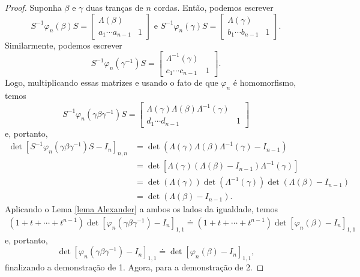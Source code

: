 \begin{proof}
		\par\vspace{0.3cm} Suponha $\beta$ e $\gamma$ duas tranças de $n$ cordas. Então, podemos escrever
		\begin{equation*}
    		S^{-1}\varphi_n(\beta)S = \left[ \begin{array}{c|c}
    		\Lambda(\beta) & \\
    		\hline
    		a_1\cdots a_{n-1} & 1
    		\end{array}\right] \text{ e } 
    		S^{-1}\varphi_n(\gamma)S = \left[  \begin{array}{c|c}
    		\Lambda(\gamma) & \\
    		\hline 
    		b_1 \cdots b_{n-1} & 1
    		\end{array}\right].
		\end{equation*}
		Similarmente, podemos escrever
		\begin{equation*}
    		S^{-1}\varphi_n(\gamma^{-1})S = \left[\begin{array}{c|c}
    		\Lambda^{-1}(\gamma) & \\
    		\hline 
    		c_1\cdots c_{n-1} & 1
    		\end{array}\right].
		\end{equation*}
		Logo, multiplicando essas matrizes e usando o fato de que $\varphi_n$ é homomorfismo, temos
		\begin{equation*}
    		S^{-1}\varphi_n(\gamma\beta\gamma^{-1})S = \left[\begin{array}{c|c}
    		\Lambda(\gamma)\Lambda(\beta)\Lambda^{-1}(\gamma) & \\
    		\hline 
    		d_1\cdots d_{n-1} & 1
    		\end{array}\right]
		\end{equation*}
		e, portanto,
		\begin{align*}
    		\det[S^{-1}\varphi_n(\gamma\beta\gamma^{-1})S - I_n]_{n,n} &= \det(\Lambda(\gamma)\Lambda(\beta)\Lambda^{-1}(\gamma) - I_{n-1}) \\ 
    		&= \det[\Lambda(\gamma)(\Lambda(\beta) - I_{n-1})\Lambda^{-1}(\gamma)] \\
    		&= \det(\Lambda(\gamma))\det(\Lambda^{-1}(\gamma))\det(\Lambda(\beta) - I_{n-1}) \\
    		&= \det(\Lambda(\beta) - I_{n-1}).
		\end{align*}
		Aplicando o Lema \ref{lema Alexander} a ambos os lados da igualdade, temos
		\begin{align*}
    		(1 + t + \cdots + t^{n-1})\det[\varphi_n(\gamma\beta\gamma^{-1}) 
    		- I_n]_{1,1}\doteq(1+t+\cdots+t^{n-1})\det[\varphi_n(\beta) - I_n]_{1,1}
		\end{align*}
		e, portanto,
		\begin{equation*}
		    \det[\varphi_n(\gamma\beta\gamma^{-1}) - I_n]_{1,1}\doteq\det[\varphi_n(\beta) - I_n]_{1,1},
		\end{equation*}
		finalizando a demonstração de 1. Agora, para a demonstração de 2.
		

\end{proof}

